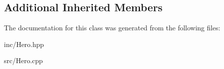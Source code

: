 \subsection*{Additional Inherited Members}


The documentation for this class was generated from the following files\+:\begin{DoxyCompactItemize}
\item 
inc/Hero.\+hpp\item 
src/Hero.\+cpp\end{DoxyCompactItemize}
